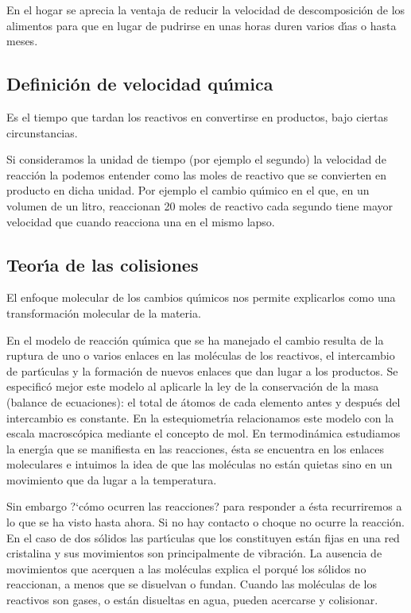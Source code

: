 En el hogar se aprecia la ventaja de reducir la velocidad de descomposici\'on de los alimentos para que en lugar de pudrirse en unas horas duren varios d\'{\i}as o hasta meses.

\subsection{Definici\'on de velocidad qu\'{\i}mica}
Es el tiempo que tardan los reactivos en convertirse en productos, bajo ciertas circunstancias.

Si consideramos la unidad de tiempo (por ejemplo el segundo) la velocidad de reacci\'on la podemos entender como las moles de reactivo que se convierten en producto en dicha unidad. Por ejemplo el cambio qu\'{\i}mi\-co en el que, en un volumen de un litro, reaccionan 20 moles de reactivo cada  segundo tiene mayor velocidad que cuando reacciona una \mole en el mismo lapso.

\subsection{Teor\'{\i}a de las colisiones}
El enfoque molecular de los cambios qu\'{\i}micos nos permite explicarlos como una transformaci\'on molecular de la materia.

En el modelo de reacci\'on qu\'{\i}mica que se ha manejado el  cambio resulta de la ruptura de uno o varios enlaces en las  mol\'eculas de los reactivos, el intercambio de  part\'{\i}culas y la formaci\'on de nuevos enlaces que dan lugar a los productos. Se especific\'o mejor este modelo al aplicarle la ley de la conservaci\'on de la masa (balance de ecuaciones): el total de \'atomos de cada elemento antes y despu\'es del intercambio es constante. En la estequiometr\'{\i}a relacionamos este modelo con la escala macrosc\'opica mediante el concepto de mol. En termodin\'amica estudiamos la energ\'{\i}a que se manifiesta en las reacciones, \'esta se  encuentra en los enlaces mole\-culares e intuimos la idea de que las mol\'eculas no est\'an quietas sino en un movimiento que da lugar  a la temperatura.
 
Sin embargo ?`c\'omo ocurren las reacciones? para responder a \'esta recurriremos a lo que se ha visto hasta ahora. Si no hay contacto o choque no ocurre la reacci\'on. En el caso de dos s\'olidos las part\'{\i}culas que los constituyen est\'an fijas en una red cristalina y sus movimientos son principalmente de vibraci\'on. La ausencia de  movimientos que acerquen a las mol\'eculas explica el porqu\'e los s\'olidos no reaccionan, a menos que se di\-suelvan o fundan. Cuando las mol\'eculas de los reactivos son gases, o est\'an disueltas en agua, pueden acercarse y colisionar.

